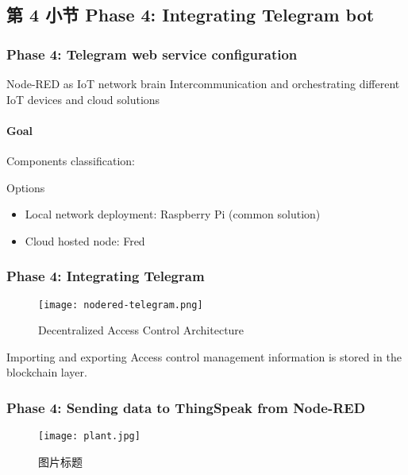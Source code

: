 \documentclass[
    aspectratio=169,                   %
]{beamer}
\begin{document}
\subsection{第 4 小节 Phase 4: Integrating Telegram bot}

    \begin{frame}
        \frametitle{Phase 4: Telegram web service configuration}

        \begin{block}{Node-RED as IoT network brain}
            Intercommunication and orchestrating different IoT devices and cloud solutions
        \end{block}

        \paragraph{Goal} Components classification:

        \begin{block}{Options}
            \begin{itemize}
                \item \alert{Local network deployment}: Raspberry Pi (common solution)
                \item \alert{Cloud hosted node}: Fred
            \end{itemize}
        \end{block}

    \end{frame}

    \begin{frame}
     \frametitle{Phase 4: Integrating Telegram}
        \begin{figure}
            \centering
            \begin{stampbox}
                \texttt{[image: nodered-telegram.png]}
            \end{stampbox}
            \caption{Decentralized Access Control Architecture}
        \end{figure}

        \begin{block}{Importing and exporting}
            Access control management information is stored in the blockchain layer.
        \end{block}
    \end{frame}

    \begin{frame}
        \frametitle{Phase 4: Sending data to ThingSpeak from Node-RED}
        \begin{figure}
            \centering
            \begin{stampbox}
                \texttt{[image: plant.jpg]}
            \end{stampbox}
            \caption{图片标题}
        \end{figure}
    \end{frame}
\end{document}
